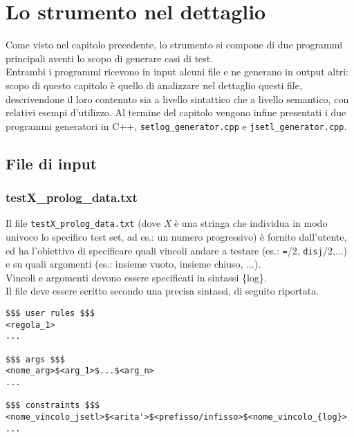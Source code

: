
\section{Lo strumento nel dettaglio}

Come visto nel capitolo precedente, lo strumento si compone di due programmi principali aventi lo scopo di generare casi di test. \\
Entrambi i programmi ricevono in input alcuni file e ne generano in output altri: scopo di questo capitolo è quello di analizzare nel dettaglio questi file, descrivendone il loro contenuto sia a livello sintattico che a livello semantico, con relativi esempi d'utilizzo.
Al termine del capitolo vengono infine presentati i due programmi generatori in C++, \texttt{setlog\_generator.cpp} e \texttt{jsetl\_generator.cpp}.

\subsection{File di input}


\subsubsection{testX\_prolog\_data.txt}
Il file \texttt{testX\_prolog\_data.txt} (dove \emph{X} è una stringa che individua in modo univoco lo specifico test set, ad es.: un numero progressivo) è fornito dall'utente, ed ha l'obiettivo di specificare quali vincoli andare a testare (es.: \texttt{=}/2, \texttt{disj}/2,...) e su quali argomenti (es.: insieme vuoto, insieme chiuso, ...).\\
Vincoli e argomenti devono essere specificati in sintassi \{log\}.\\
Il file deve essere scritto secondo una precisa sintassi, di seguito riportata.\\

\begin{lstlisting}
$$$ user rules $$$
<regola_1>
...

$$$ args $$$
<nome_arg>$<arg_1>$...$<arg_n>
...

$$$ constraints $$$
<nome_vincolo_jsetl>$<arita'>$<prefisso/infisso>$<nome_vincolo_{log}>
...
\end{lstlisting}


